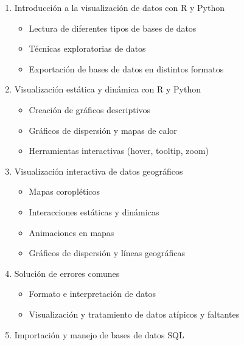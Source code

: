 \documentclass[
]{book}
\providecommand{\tightlist}{%
  \setlength{\itemsep}{0pt}\setlength{\parskip}{0pt}}
\begin{document}
\begin{enumerate}
\def\labelenumi{\arabic{enumi}.}
\tightlist
\item
  Introducción a la visualización de datos con R y Python

  \begin{itemize}
  \tightlist
  \item
    Lectura de diferentes tipos de bases de datos\\
  \item
    Técnicas exploratorias de datos\\
  \item
    Exportación de bases de datos en distintos formatos
  \end{itemize}
\item
  Visualización estática y dinámica con R y Python

  \begin{itemize}
  \tightlist
  \item
    Creación de gráficos descriptivos\\
  \item
    Gráficos de dispersión y mapas de calor\\
  \item
    Herramientas interactivas (hover, tooltip, zoom)
  \end{itemize}
\item
  Visualización interactiva de datos geográficos

  \begin{itemize}
  \tightlist
  \item
    Mapas coropléticos\\
  \item
    Interacciones estáticas y dinámicas\\
  \item
    Animaciones en mapas\\
  \item
    Gráficos de dispersión y líneas geográficas
  \end{itemize}
\item
  Solución de errores comunes

  \begin{itemize}
  \tightlist
  \item
    Formato e interpretación de datos\\
  \item
    Visualización y tratamiento de datos atípicos y faltantes
  \end{itemize}
\item
  Importación y manejo de bases de datos SQL


\end{enumerate}
\end{document}
